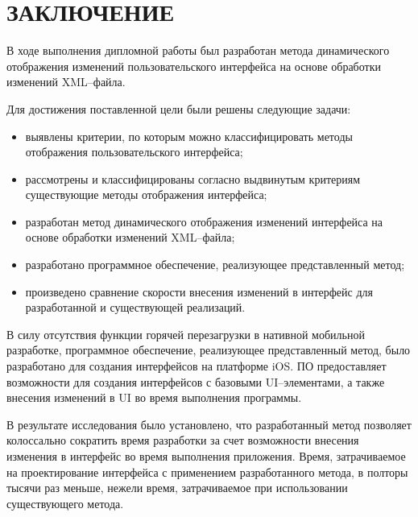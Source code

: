 \section*{ЗАКЛЮЧЕНИЕ}

В ходе выполнения дипломной работы был разработан метода динамического отображения изменений пользовательского интерфейса на основе обработки изменений XML–файла.

Для достижения поставлен­ной цели были решены следующие задачи:

\begin{itemize}[label=---]
	\item выявлены критерии, по которым можно классифицировать методы отображения пользовательского интерфейса;
	\item рассмотрены и классифицированы согласно выдвинутым критериям существующие методы отображения интерфейса;
	\item разработан метод динамического отображения изменений интерфейса на основе обработки изменений XML--файла;
	\item разработано программное обеспечение, реализующее представленный метод;
	\item произведено сравнение скорости внесения изменений в интерфейс для разработанной и существующей реализаций.
\end{itemize}

В силу отсутствия функции горячей перезагрузки в нативной мобильной разработке, программное обеспечение, реализующее представленный метод, было разработано для создания интерфейсов на платформе iOS.
ПО предоставляет возможности для создания интерфейсов с базовыми UI--элементами, а также внесения изменений в UI во время выполнения программы.

В результате исследования было установлено, что разработанный метод позволяет колоссально сократить время разработки за счет возможности внесения изменения в интерфейс во время выполнения приложения.
Время, затрачиваемое на проектирование интерфейса с применением разработанного метода, в полторы тысячи раз меньше, нежели время, затрачиваемое при использовании существующего метода.

\pagebreak